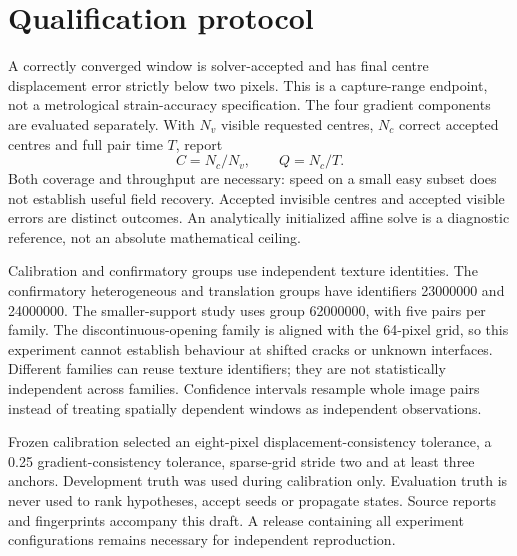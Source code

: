 \documentclass[11pt,a4paper]{article}
\begin{document}
\section{Qualification protocol}
A correctly converged window is solver-accepted and has final centre displacement error strictly below two pixels. This is a capture-range endpoint, not a metrological strain-accuracy specification. The four gradient components are evaluated separately. With $N_v$ visible requested centres, $N_c$ correct accepted centres and full pair time $T$, report
\begin{equation}C=N_c/N_v,\qquad Q=N_c/T.\end{equation}
Both coverage and throughput are necessary: speed on a small easy subset does not establish useful field recovery. Accepted invisible centres and accepted visible errors are distinct outcomes. An analytically initialized affine solve is a diagnostic reference, not an absolute mathematical ceiling.

Calibration and confirmatory groups use independent texture identities. The confirmatory heterogeneous and translation groups have identifiers 23000000 and 24000000. The smaller-support study uses group 62000000, with five pairs per family. The discontinuous-opening family is aligned with the 64-pixel grid, so this experiment cannot establish behaviour at shifted cracks or unknown interfaces. Different families can reuse texture identifiers; they are not statistically independent across families. Confidence intervals resample whole image pairs instead of treating spatially dependent windows as independent observations.

Frozen calibration selected an eight-pixel displacement-consistency tolerance, a 0.25 gradient-consistency tolerance, sparse-grid stride two and at least three anchors. Development truth was used during calibration only. Evaluation truth is never used to rank hypotheses, accept seeds or propagate states. Source reports and fingerprints accompany this draft. A release containing all experiment configurations remains necessary for independent reproduction.
\end{document}
